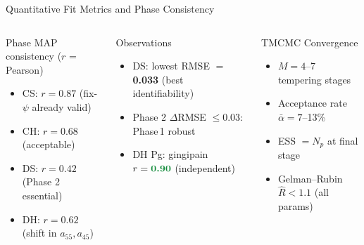 \documentclass[aspectratio=169,10pt,t]{beamer}
\newcommand{\hl}[1]{\textbf{\textcolor{ikm}{#1}}}
\newcommand{\hlg}[1]{\textbf{\textcolor{green2}{#1}}}
\begin{document}
\begin{frame}[t]{Quantitative Fit Metrics and Phase Consistency}
\begin{columns}[T]
      \begin{block}{Phase MAP consistency ($r$ = Pearson)}
        \begin{itemize}\setlength{\itemsep}{3pt}
          \item CS: $r=0.87$ (fix-$\psi$ already valid)
          \item CH: $r=0.68$ (acceptable)
          \item DS: $r=0.42$ (Phase 2 essential)
          \item DH: $r=0.62$ (shift in $a_{55},a_{45}$)
        \end{itemize}
      \end{block}
      \begin{block}{Observations}
        \begin{itemize}\setlength{\itemsep}{4pt}
          \item DS: lowest RMSE $=$ \hl{0.033} (best identifiability)
          \item Phase 2 $\Delta$RMSE $\leq0.03$: Phase\,1 robust
          \item DH Pg: gingipain $r=\hlg{0.90}$ (independent)
        \end{itemize}
      \end{block}
      \vspace{8pt}
      \begin{block}{TMCMC Convergence}
        \begin{itemize}\setlength{\itemsep}{4pt}
          \item $M=4$--7 tempering stages
          \item Acceptance rate $\bar\alpha=7$--13\%
          \item ESS $=N_p$ at final stage
          \item Gelman--Rubin $\hat R<1.1$ (all params)
        \end{itemize}
      \end{block}
  \end{columns}
\end{frame}
\end{document}
